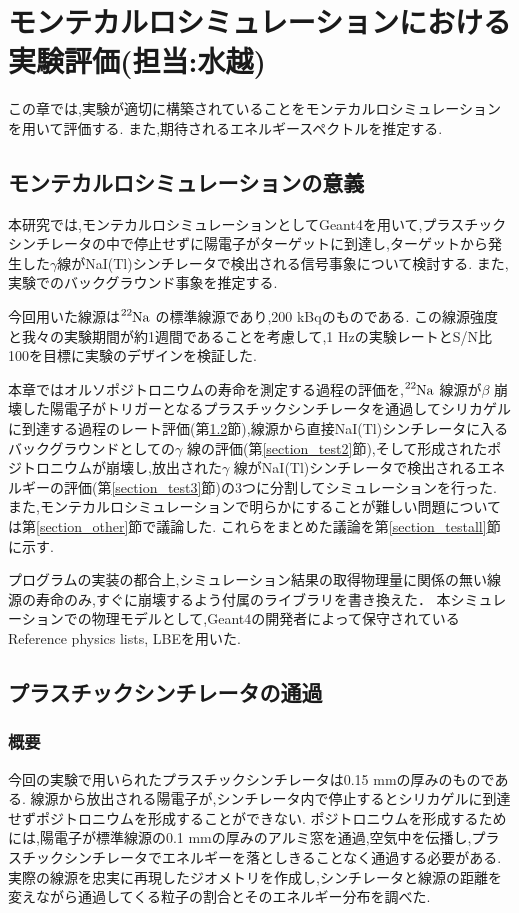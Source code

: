 \chapter{モンテカルロシミュレーションにおける実験評価(担当:水越)}\label{simulation}

この章では,実験が適切に構築されていることをモンテカルロシミュレーションを用いて評価する.
また,期待されるエネルギースペクトルを推定する.

\section{モンテカルロシミュレーションの意義}

本研究では,モンテカルロシミュレーションとしてGeant4\cite{geant4}を用いて,プラスチックシンチレータの中で停止せずに陽電子がターゲットに到達し,ターゲットから発生した$\gamma$線がNaI(Tl)シンチレータで検出される信号事象について検討する.
また,実験でのバックグラウンド事象を推定する.

今回用いた線源は$\ce{^{22}Na}$ の標準線源であり,200 kBqのものである.
この線源強度と我々の実験期間が約1週間であることを考慮して,1 Hzの実験レートとS/N比100を目標に実験のデザインを検証した.


本章ではオルソポジトロニウムの寿命を測定する過程の評価を,$\ce{^{22}Na}$ 線源が$\beta$ 崩壊した陽電子がトリガーとなるプラスチックシンチレータを通過してシリカゲルに到達する過程のレート評価(第\ref{section_test1}節),線源から直接NaI(Tl)シンチレータに入るバックグラウンドとしての$\gamma$ 線の評価(第\ref{section_test2}節),そして形成されたポジトロニウムが崩壊し,放出された$\gamma$ 線がNaI(Tl)シンチレータで検出されるエネルギーの評価(第\ref{section_test3}節)の3つに分割してシミュレーションを行った.
また,モンテカルロシミュレーションで明らかにすることが難しい問題については第\ref{section_other}節で議論した.
これらをまとめた議論を第\ref{section_testall}節に示す.

プログラムの実装の都合上,シミュレーション結果の取得物理量に関係の無い線源の寿命のみ,すぐに崩壊するよう付属のライブラリを書き換えた．
本シミュレーションでの物理モデルとして,Geant4の開発者によって保守されているReference physics lists, LBEを用いた.

\section{プラスチックシンチレータの通過}
\label{section_test1}

\subsection{概要}
今回の実験で用いられたプラスチックシンチレータは0.15 mmの厚みのものである.
線源から放出される陽電子が,シンチレータ内で停止するとシリカゲルに到達せずポジトロニウムを形成することができない.
ポジトロニウムを形成するためには,陽電子が標準線源の0.1 mmの厚みのアルミ窓を通過,空気中を伝播し,プラスチックシンチレータでエネルギーを落としきることなく通過する必要がある.
実際の線源を忠実に再現したジオメトリを作成し,シンチレータと線源の距離を変えながら通過してくる粒子の割合とそのエネルギー分布を調べた.



